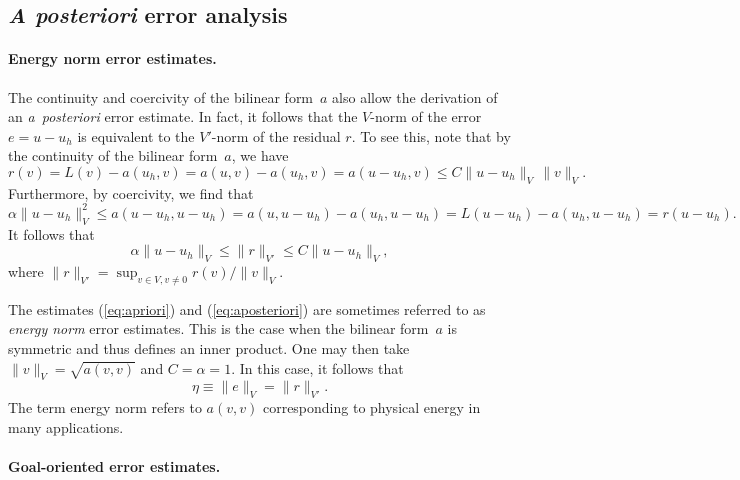 \subsection{\emph{A posteriori} error analysis}

\paragraph{Energy norm error estimates.}

The continuity and coercivity of the bilinear form~$a$ also allow the
derivation of an \emph{a~posteriori} error estimate.  In fact, it
follows that the $V$-norm of the error $e = u - u_h$ is equivalent to
the $V'$-norm of the residual $r$. To see this, note that by the
continuity of the bilinear form~$a$, we have
\begin{equation}
  r(v)
  = L(v) - a(u_h, v) = a(u, v) - a(u_h, v) = a(u - u_h, v)
  \leqslant C \|u - u_h\|_V \, \|v\|_V.
\end{equation}
Furthermore, by coercivity, we find that
\begin{equation}
  \alpha \|u - u_h\|^2_V
  \leqslant a(u - u_h, u - u_h)
  = a(u, u - u_h) - a(u_h, u - u_h)
  = L(u - u_h) - a(u_h, u - u_h) = r(u - u_h).
\end{equation}
It follows that
\begin{equation} \label{eq:aposteriori}
  \alpha \|u - u_h\|_V \leqslant \|r\|_{V'} \leqslant C \|u - u_h\|_V,
\end{equation}
where $\|r\|_{V'} = \sup_{v \in V, v \neq 0} r(v)/ \|v\|_V$.

The estimates (\ref{eq:apriori}) and (\ref{eq:aposteriori}) are
sometimes referred to as \emph{energy norm} error estimates. This is
the case when the bilinear form~$a$ is symmetric and thus defines an
inner product. One may then take $\|v\|_V = \sqrt{a(v, v)}$ and $C =
\alpha = 1$. In this case, it follows that
\begin{equation} \label{eq:aposteriori,energynorm}
  \eta \equiv \|e\|_V = \|r\|_{V'}.
\end{equation}
The term energy norm refers to $a(v, v)$ corresponding to physical
energy in many applications.

\paragraph{Goal-oriented error estimates.}


